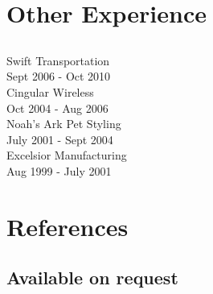 \documentclass[letterpaper]{deedy-resume} %
\begin{document}
\begin{minipage}[t]{0.33\textwidth} %
\section{Other Experience}
\subsection{} 
Swift Transportation\\
Sept 2006 - Oct 2010\\
\sectionspace
{}
Cingular Wireless\\
Oct 2004 - Aug 2006\\
\sectionspace
{}
Noah's Ark Pet Styling\\
July 2001 - Sept 2004\\
\sectionspace
{}
Excelsior Manufacturing\\
Aug 1999 - July 2001\\
\sectionspace %
\section{References}
\subsection{Available on request}
\end{minipage} %
\hfill
%
%
\end{document}
